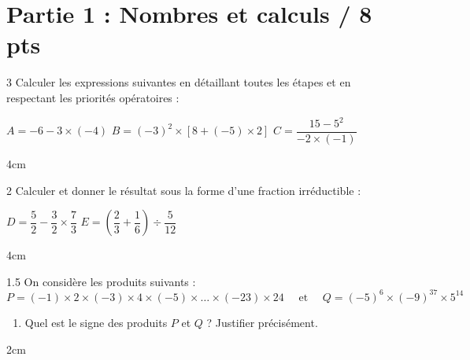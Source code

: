 \documentclass[a4paper]{book}
\begin{document}
{\vspace{0.5cm}
    
\section*{Partie 1 : Nombres et calculs \points[2]/ 8 pts }

    \begin{exerciceNote}{3}
        Calculer les expressions suivantes en détaillant toutes les étapes et en respectant les priorités opératoires :
        \medskip
        
        $A = -6 - 3 \times (-4)$ \quad $B = (-3)^2 \times [8 + (-5) \times 2]$ \quad $C = \dfrac{15 - 5^2}{-2 \times (-1)}$
        
        \begin{ZoneReponse}{4cm}
        \end{ZoneReponse}
    \end{exerciceNote}
    
    \begin{exerciceNote}{2}
        Calculer et donner le résultat sous la forme d'une fraction irréductible :
        \medskip
        
        $D = \dfrac{5}{2} - \dfrac{3}{2} \times \dfrac{7}{3}$ \quad $E = \left(\dfrac{2}{3} + \dfrac{1}{6}\right) \div \dfrac{5}{12}$
        
        \begin{ZoneReponse}{4cm}
        \end{ZoneReponse}
    \end{exerciceNote}
    
    
    \begin{exerciceNote}{1.5}
        On considère les produits suivants : 
        $$P = (-1) \times 2 \times (-3) \times 4 \times (-5) \times \dots \times (-23) \times 24 
        \quad \text{  et  } \quad Q=(-5)^6\times(-9)^{37}\times5^{14}$$
        \begin{enumerate}
            \item Quel est le signe des produits $P$ et $Q$ ? Justifier précisément.
        \end{enumerate}
        
        \begin{ZoneReponse}{2cm}
        \end{ZoneReponse}
    \end{exerciceNote}
    
}
\end{document}
